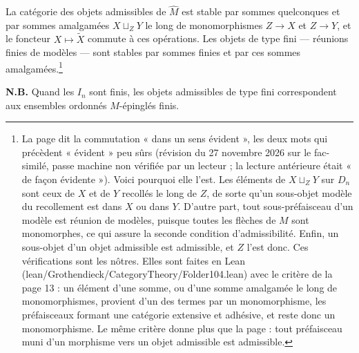 \documentclass[11pt,a4paper]{article}
\begin{document}
La catégorie des objets admissibles de $\widehat{M}$ est stable par sommes
quelconques et par sommes amalgamées $X \sqcup_{Z} Y$ le long de
monomorphismes $Z \to X$ et $Z \to Y$, et le foncteur $X \mapsto
\widetilde{X}$ commute à ces opérations. Les objets de type fini --- réunions
finies de modèles --- sont stables par sommes finies et par ces sommes
amalgamées.\footnote{La page dit la commutation « dans un sens évident », les
deux mots qui précèdent « évident » peu sûrs (révision du 27 novembre 2026 sur
le fac-similé, passe machine non vérifiée par un lecteur ; la lecture
antérieure était « de façon évidente »). Voici
pourquoi elle l'est. Les éléments de $X \sqcup_{Z} Y$ sur $D_{n}$ sont ceux de
$X$ et de $Y$ recollés le long de $Z$, de sorte qu'un sous-objet modèle du
recollement est dans $X$ ou dans $Y$. D'autre part, tout sous-préfaisceau d'un
modèle est réunion de modèles, puisque toutes les flèches de $M$ sont
monomorphes, ce qui assure la seconde condition d'admissibilité. Enfin, un
sous-objet d'un objet admissible est admissible, et $Z$ l'est donc. Ces
vérifications sont les nôtres. Elles sont faites en Lean
(lean/Grothendieck/CategoryTheory/Folder104.lean) avec le critère de la page 13 : un élément
d'une somme, ou d'une somme amalgamée le long de monomorphismes, provient d'un
des termes par un monomorphisme, les préfaisceaux formant une catégorie
extensive et adhésive, et reste donc un monomorphisme. Le même critère donne
plus que la page : tout préfaisceau muni d'un morphisme vers un objet
admissible est admissible.}

\textbf{N.B.} Quand les $I_{n}$ sont finis, les objets admissibles de type fini
correspondent aux ensembles ordonnés $M$-épinglés finis.
\end{document}
